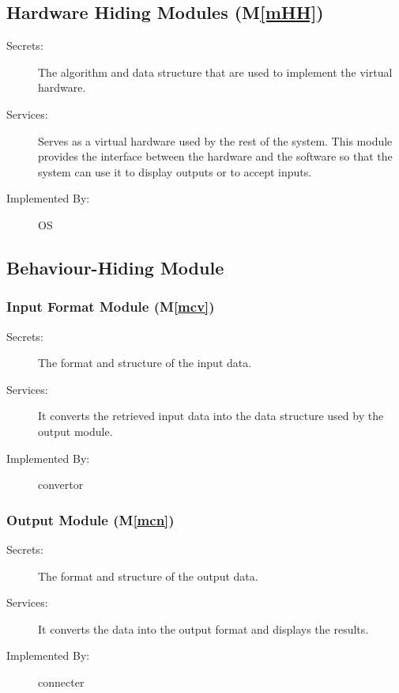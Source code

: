 \documentclass[12pt, titlepage]{article}
\newcommand{\mref}[1]{M\ref{#1}}
\begin{document}
\subsection{Hardware Hiding Modules (\mref{mHH})}

\begin{description}
\item[Secrets:]The algorithm and data structure that are used to implement the virtual hardware.
\item[Services:]Serves as a virtual hardware used by the rest of the
  system. This module provides the interface between the hardware and the
  software so that the system can use it to display outputs or to accept inputs.
\item[Implemented By:] OS
\end{description}

\subsection{Behaviour-Hiding Module}

\subsubsection{Input Format Module (\mref{mcv})}
\begin{description}
\item[Secrets:]The format and structure of the input data.
\item[Services:] It converts the retrieved input data into the data structure used by the output module.
\item[Implemented By:] convertor
\end{description}

\subsubsection{Output Module (\mref{mcn})}
\begin{description}
\item[Secrets:]The format and structure of the output data.
\item[Services:] It converts the data into the output format and displays the results.
\item[Implemented By:] connecter
\end{description}
\end{document}
